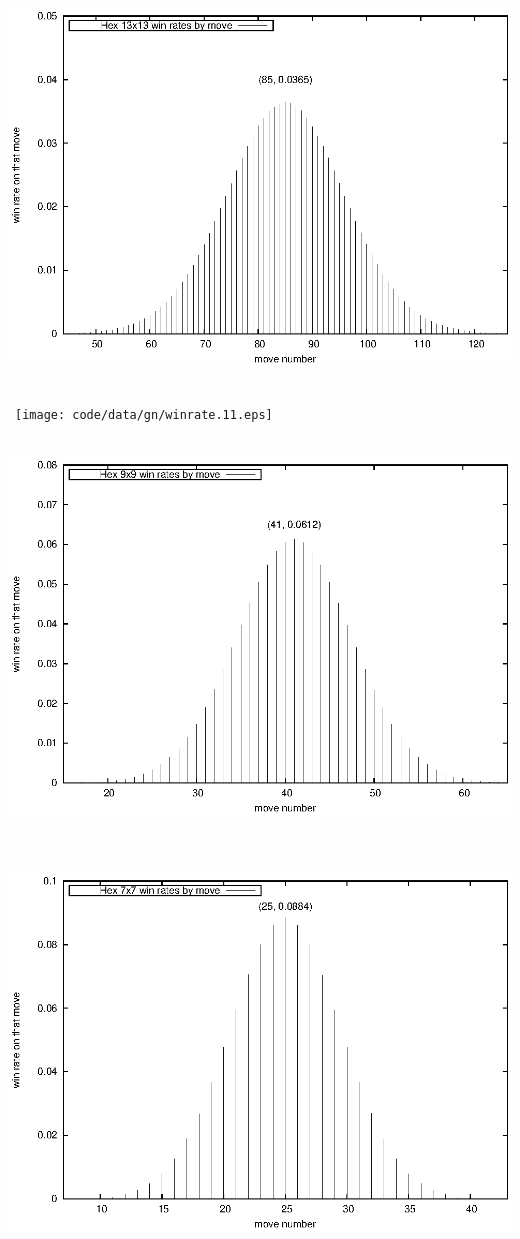 \documentclass[12pt]{article}
\begin{document}
\ \hfill \includegraphics{code/data/gn/winrate.13.eps} \hfill \ 

\ \hfill \texttt{[image: code/data/gn/winrate.11.eps]} \hfill \ 

\ \hfill \includegraphics{code/data/gn/winrate.9.eps} \hfill \ 

\ \hfill \includegraphics{code/data/gn/winrate.7.eps} \hfill \ 
\end{document}
